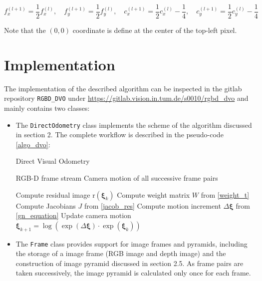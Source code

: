 \documentclass[acmsmall, nonacm, 11pt]{acmart}
\begin{document}
\begin{equation}
f_{x}^{(l+1)}=\frac{1}{2} f_{x}^{(l)}, \quad f_{y}^{(l+1)}=\frac{1}{2} f_{y}^{(l)}, \quad c_{x}^{(l+1)}=\frac{1}{2} c_{x}^{(l)}-\frac{1}{4}, \quad c_{y}^{(l+1)}=\frac{1}{2} c_{y}^{(l)}-\frac{1}{4}
\end{equation}

Note that the $(0, 0)$ coordinate is define at the center of the top-left pixel.

\section{Implementation}
The implementation of the described algorithm can be inspected in the gitlab repository \verb|RGBD_DVO| under \url{https://gitlab.vision.in.tum.de/s0010/rgbd_dvo} and mainly contains two classes:

\begin{itemize}
    \item The \verb|DirectOdometry| class implements the scheme of the algorithm discussed in section 2. The complete workflow is described in the pseudo-code \ref{algo_dvo}:
    \begin{algorithm}[h]
        \caption {Direct Visual Odometry}
        \label{algo_dvo}
        \begin{algorithmic}[1]
        \REQUIRE RGB-D frame stream
        \ENSURE Camera motion of all successive frame pairs
        
                    \STATE Compute residual image $\mathrm{r}(\boldsymbol{\xi}_k)$
                    \STATE Compute weight matrix $W$ from \eqref{weight_t}
                    \STATE Compute Jacobians $J$ from \eqref{jacob_res}
                    \STATE Compute motion increment $\Delta \boldsymbol{\xi}$ from \eqref{gn_equation}
                    \STATE Update camera motion $\boldsymbol{\xi}_{k+1} = \log \left(\exp (\Delta\boldsymbol{\xi}) \cdot \exp (\boldsymbol{\xi}_{k})\right)$
                \ENDWHILE
            \ENDFOR
        \ENDFOR
        \end{algorithmic}
    \end{algorithm}
    \item The \verb|Frame| class provides support for image frames and pyramids, including the storage of a image frame (RGB image and depth image) and the construction of image pyramid discussed in section 2.5. As frame pairs are taken successively, the image pyramid is calculated only once for each frame.
\end{itemize}
\end{document}
